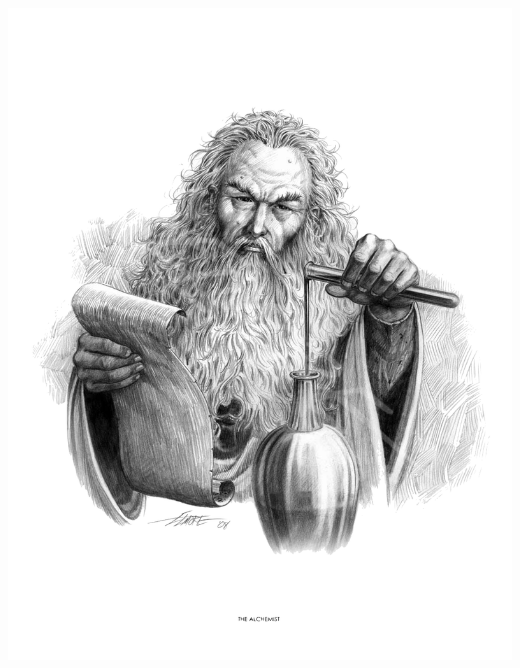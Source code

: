 \begin{multicols*}{2}
\begin{Figure}
\centering
\includegraphics[width=\textwidth]{img/wizard.png}
\end{Figure}
    
\end{multicols*}


\clearpage

